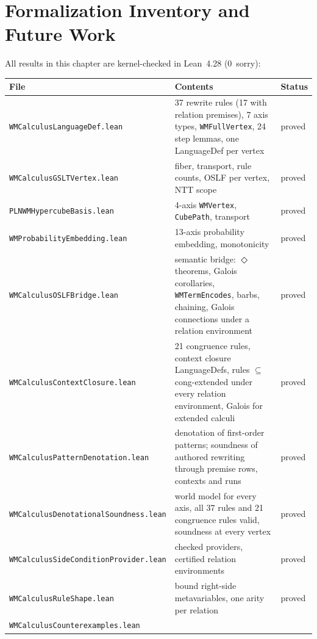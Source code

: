 \documentclass[11pt,openany]{report}
\begin{document}
\section{Formalization Inventory and Future Work}
\label{sec:wm-inventory}
\label{sec:wm-gslt-future}

All results in this chapter are kernel-checked in Lean~4.28 (0~sorry):

\begin{center}
\begin{tabular}{lll}
\toprule
\textbf{File} & \textbf{Contents} & \textbf{Status} \\
\midrule
\texttt{WMCalculusLanguageDef.lean}
  & 37 rewrite rules (17 with relation premises), 7 axis types,
    \texttt{WMFullVertex}, 24 step lemmas, one LanguageDef per vertex
  & proved \\
\texttt{WMCalculusGSLTVertex.lean}
  & fiber, transport, rule counts, OSLF per vertex, NTT scope
  & proved \\
\texttt{PLNWMHypercubeBasis.lean}
  & 4-axis \texttt{WMVertex}, \texttt{CubePath}, transport
  & proved \\
\texttt{WMProbabilityEmbedding.lean}
  & 13-axis probability embedding, monotonicity
  & proved \\
\texttt{WMCalculusOSLFBridge.lean}
  & semantic bridge: $\Diamond$ theorems, Galois corollaries,
    \texttt{WMTermEncodes}, barbs, chaining,
    Galois connections under a relation environment
  & proved \\
\texttt{WMCalculusContextClosure.lean}
  & 21 congruence rules, context closure LanguageDefs,
    rules $\subseteq$ cong-extended under every relation environment,
    Galois for extended calculi
  & proved \\
\texttt{WMCalculusPatternDenotation.lean}
  & denotation of first-order patterns; soundness of authored rewriting
    through premise rows, contexts and runs
  & proved \\
\texttt{WMCalculusDenotationalSoundness.lean}
  & world model for every axis, all 37 rules and 21 congruence rules valid,
    soundness at every vertex
  & proved \\
\texttt{WMCalculusSideConditionProvider.lean}
  & checked providers, certified relation environments
  & proved \\
\texttt{WMCalculusRuleShape.lean}
  & bound right-side metavariables, one arity per relation
  & proved \\
\texttt{WMCalculusCounterexamples.lean}

\end{tabular}
\end{center}
\end{document}
